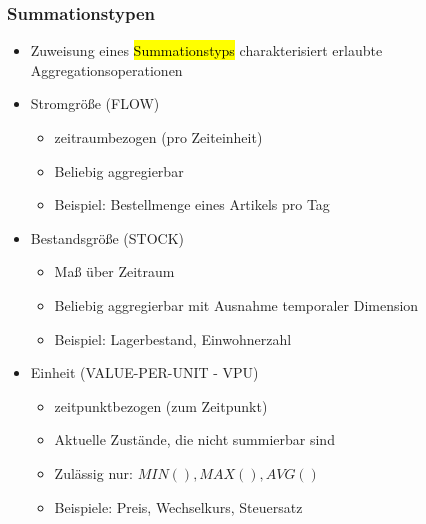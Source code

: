         \begin{frame}

        \frametitle{Summationstypen}
        \begin{itemize}
        \item Zuweisung eines \hl{Summationstyps} charakterisiert erlaubte
          Aggregationsoperationen
        \item Stromgröße (FLOW)
          \begin{itemize}
          \item zeitraumbezogen (pro Zeiteinheit)
          \item Beliebig aggregierbar
          \item Beispiel: Bestellmenge eines Artikels pro Tag
          \end{itemize}
        \item Bestandsgröße (STOCK)
          \begin{itemize}
          \item Maß über Zeitraum
          \item Beliebig aggregierbar mit Ausnahme temporaler Dimension
          \item Beispiel: Lagerbestand, Einwohnerzahl
          \end{itemize}
        \item Einheit (VALUE-PER-UNIT - VPU)
          \begin{itemize}
          \item zeitpunktbezogen (zum Zeitpunkt)
          \item Aktuelle Zustände, die nicht summierbar sind
          \item Zulässig nur: $MIN(), MAX(), AVG()$
          \item Beispiele: Preis, Wechselkurs, Steuersatz
        \end{itemize}
        \end{itemize}

        \end{frame}

